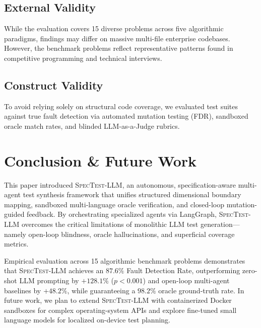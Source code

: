 \documentclass[conference]{IEEEtran}
\begin{document}
\subsection{External Validity}
While the evaluation covers 15 diverse problems across five algorithmic paradigms, findings may differ on massive multi-file enterprise codebases. However, the benchmark problems reflect representative patterns found in competitive programming and technical interviews.

\subsection{Construct Validity}
To avoid relying solely on structural code coverage, we evaluated test suites against true fault detection via automated mutation testing (FDR), sandboxed oracle match rates, and blinded LLM-as-a-Judge rubrics.

\section{Conclusion \& Future Work}
\label{sec:conclusion}

This paper introduced \textsc{SpecTest-LLM}, an autonomous, specification-aware multi-agent test synthesis framework that unifies structured dimensional boundary mapping, sandboxed multi-language oracle verification, and closed-loop mutation-guided feedback. By orchestrating specialized agents via LangGraph, \textsc{SpecTest-LLM} overcomes the critical limitations of monolithic LLM test generation—namely open-loop blindness, oracle hallucinations, and superficial coverage metrics.

Empirical evaluation across 15 algorithmic benchmark problems demonstrates that \textsc{SpecTest-LLM} achieves an $87.6\%$ Fault Detection Rate, outperforming zero-shot LLM prompting by $+128.1\%$ ($p < 0.001$) and open-loop multi-agent baselines by $+48.2\%$, while guaranteeing a $98.2\%$ oracle ground-truth rate. In future work, we plan to extend \textsc{SpecTest-LLM} with containerized Docker sandboxes for complex operating-system APIs and explore fine-tuned small language models for localized on-device test planning.
\end{document}
